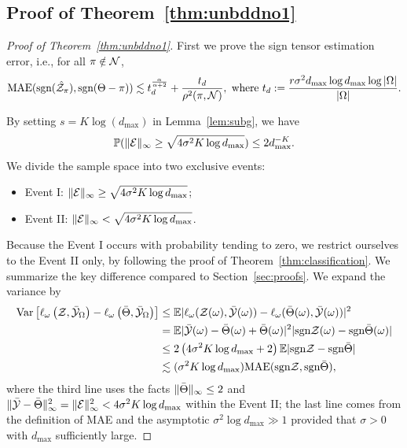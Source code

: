 \documentclass[twoside,11pt]{article}
\theoremstyle{plain}
\theoremstyle{definition}
\def\sign{\textup{sgn}}
\begin{document}
\subsection{Proof of Theorem~\ref{thm:unbddno1}}
\begin{proof}[Proof of Theorem~\ref{thm:unbddno1}]
First we prove the sign tensor estimation error, i.e., for all $\pi \notin\mathcal{N}$, 
\begin{align}
 \textup{MAE}(\textup{sgn}(\hat {\mathcal{Z}}_\pi),\textup{sgn}(\Theta-\pi))\lesssim t_d^{\alpha\over \alpha+2}+\frac{t_d}{\rho^2(\pi,\mathcal{N})}, \text{ where } t_d :={ r\sigma^2d_{\max}\log d_{\max}\log |\Omega|\over |\Omega|}.
\end{align} 


By setting $s=K\log(d_{\max})$ in Lemma~\ref{lem:subg}, we have
\[
\mathbb{P}(\lVert\mathcal{E}\rVert_\infty\geq \sqrt{4\sigma^2K\log d_{\max}} )\leq 2d_{\max}^{-K}.
\]
We divide the sample space into two exclusive events:
\begin{itemize}
\item Event I: $\lVert\mathcal{E}\rVert_\infty\geq \sqrt{4\sigma^2K\log d_{\max}}$;
\item Event II: $\lVert\mathcal{E}\rVert_\infty< \sqrt{4\sigma^2K\log d_{\max}}$.
\end{itemize}
Because the Event I occurs with probability tending to zero, we restrict ourselves to the Event II only, by following the proof of Theorem~\ref{thm:classification}. We summarize the key difference compared to Section~\ref{sec:proofs}. 
We expand the variance by 
\begin{align}
    \label{eq:variance2}
    \text{Var}\left[\ell_\omega\left(\tZ,\bar\tY_\Omega\right)-\ell_\omega\left(\bar\Theta,\bar\tY_\Omega\right)\right]&\leq \mathbb{E}|\ell_\omega(\tZ(\omega),\bar\tY(\omega))-\ell_\omega(\bar\Theta(\omega),\bar\tY(\omega))|^2\notag \\
    &= \mathbb{E}|\bar \tY(\omega)-\bar \Theta(\omega)+\bar\Theta(\omega)|^2|\text{sgn}\tZ(\omega)-\text{sgn}\bar\Theta(\omega)| \notag \\
    &\leq 2\left(4 \sigma^2K\log d_{\max}+2\right) \mathbb{E}|\text{sgn}\tZ-\text{sgn}\bar\Theta| \notag \\
    & \lesssim (\sigma^2K \log d_{\max}) \text{MAE}(\sign \tZ, \sign \bar \Theta),
    \end{align}
where the third line uses the facts $\lVert\bar \Theta\rVert_\infty\leq 2$ and $\lVert\bar {\mathcal{Y}}-\bar \Theta\rVert_\infty^2=\lVert\mathcal{E}\rVert_\infty^2<4 \sigma^2K\log d_{\max}$ within the Event II; the last line comes from the definition of MAE and the asymptotic $\sigma^2\log d_{\max}\gg 1$ provided that $\sigma>0$ with $d_{\max}$ sufficiently large. 


\end{proof}
\end{document}
